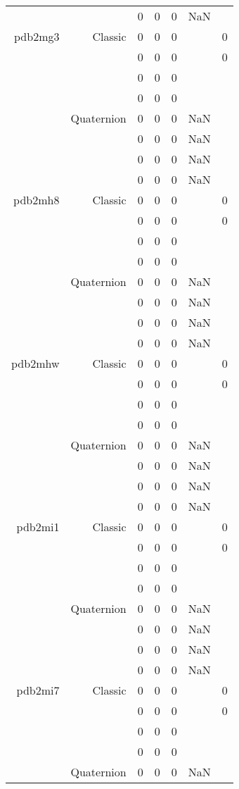 \begin{xltabular}{\textwidth}{r|rcccSc}
& & 0 & 0 & 0 & NaN & \\ \addlinespace
pdb2mg3 & Classic & 0 & 0 & 0 & & 0 \\
& & 0 & 0 & 0 & & 0 \\
& & 0 & 0 & 0 & & \\
& & 0 & 0 & 0 & & \\
& Quaternion & 0 & 0 & 0 & NaN & \\
& & 0 & 0 & 0 & NaN & \\
& & 0 & 0 & 0 & NaN & \\
& & 0 & 0 & 0 & NaN & \\ \addlinespace
pdb2mh8 & Classic & 0 & 0 & 0 & & 0 \\
& & 0 & 0 & 0 & & 0 \\
& & 0 & 0 & 0 & & \\
& & 0 & 0 & 0 & & \\
& Quaternion & 0 & 0 & 0 & NaN & \\
& & 0 & 0 & 0 & NaN & \\
& & 0 & 0 & 0 & NaN & \\
& & 0 & 0 & 0 & NaN & \\ \addlinespace
pdb2mhw & Classic & 0 & 0 & 0 & & 0 \\
& & 0 & 0 & 0 & & 0 \\
& & 0 & 0 & 0 & & \\
& & 0 & 0 & 0 & & \\
& Quaternion & 0 & 0 & 0 & NaN & \\
& & 0 & 0 & 0 & NaN & \\
& & 0 & 0 & 0 & NaN & \\
& & 0 & 0 & 0 & NaN & \\ \addlinespace
pdb2mi1 & Classic & 0 & 0 & 0 & & 0 \\
& & 0 & 0 & 0 & & 0 \\
& & 0 & 0 & 0 & & \\
& & 0 & 0 & 0 & & \\
& Quaternion & 0 & 0 & 0 & NaN & \\
& & 0 & 0 & 0 & NaN & \\
& & 0 & 0 & 0 & NaN & \\
& & 0 & 0 & 0 & NaN & \\ \addlinespace
pdb2mi7 & Classic & 0 & 0 & 0 & & 0 \\
& & 0 & 0 & 0 & & 0 \\
& & 0 & 0 & 0 & & \\
& & 0 & 0 & 0 & & \\
& Quaternion & 0 & 0 & 0 & NaN & \\

\end{xltabular}
